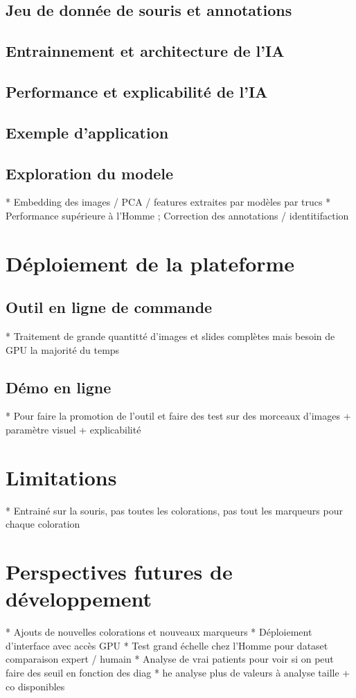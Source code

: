 \subsection{Jeu de donnée de souris et annotations}
\subsection{Entrainnement et architecture de l'IA}
\subsection{ Performance et explicabilité de l'IA}
\subsection{Exemple d'application}
\subsection{Exploration du modele}
* Embedding des images / PCA / features extraites par modèles par trucs
* Performance supérieure à l'Homme ; Correction des annotations / identitifaction


\section{Déploiement de la plateforme}
\subsection{Outil en ligne de commande}
* Traitement de grande quantitté d'images et slides complètes mais besoin de GPU la majorité du temps
\subsection{Démo en ligne}
* Pour faire la promotion de l'outil et faire des test sur des morceaux d'images + paramètre visuel + explicabilité
\section{Limitations}
* Entrainé sur la souris, pas toutes les colorations, pas tout les marqueurs pour chaque coloration

\section{Perspectives futures de développement}
* Ajouts de nouvelles colorations et nouveaux marqueurs
* Déploiement d'interface avec accès GPU
* Test grand échelle chez l'Homme pour dataset comparaison expert / humain
* Analyse de vrai patients pour voir si on peut faire des seuil en fonction des diag
* he analyse plus de valeurs à analyse taille + co disponibles